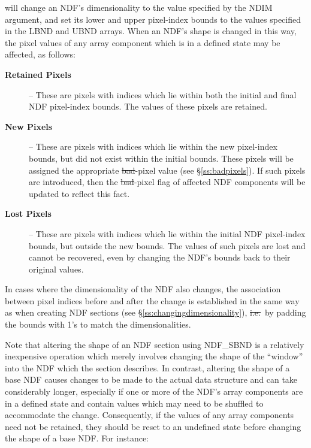 will change an NDF's dimensionality to the value specified by the NDIM
argument, and set its lower and upper pixel-index bounds to the values
specified in the LBND and UBND arrays. 
When an NDF's shape is changed in this way, the pixel values of any array
component which is in a defined state may be affected, as follows: 

\begin{description}

\item[{\bf Retained Pixels}] -- These are pixels with indices which lie
within both the initial and final NDF pixel-index bounds. 
The values of these pixels are retained.

\item[{\bf New Pixels}] -- These are pixels with indices which lie within
the new pixel-index bounds, but did not exist within the initial bounds. 
These pixels will be assigned the appropriate \st{bad\/}-pixel value (see 
\S\ref{ss:badpixels}).
If such pixels are introduced, then the \st{bad\/}-pixel flag of affected NDF 
components will be updated to reflect this fact.

\item[{\bf Lost Pixels}] -- These are pixels with indices which lie within
the initial NDF pixel-index bounds, but outside the new bounds. 
The values of such pixels are lost and cannot be recovered, even by changing
the NDF's bounds back to their original values. 

\end{description}

In cases where the dimensionality of the NDF also changes, the association
between pixel indices before and after the change is established in the same
way as when creating NDF sections (see \S\ref{ss:changingdimensionality}),
\st{i.e.}\ by padding the bounds with 1's to match the dimensionalities. 

Note that altering the shape of an NDF section using NDF\_SBND is a
relatively inexpensive operation which merely involves changing the shape of
the ``window'' into the NDF which the section describes. 
In contrast, altering the shape of a base NDF causes changes to be made to
the actual data structure and can take considerably longer, especially if one
or more of the NDF's array components are in a defined state and contain
values which may need to be shuffled to accommodate the change. 
Consequently, if the values of any array components need not be retained,
they should be reset to an undefined state before changing the shape of a
base NDF. 
For instance:

